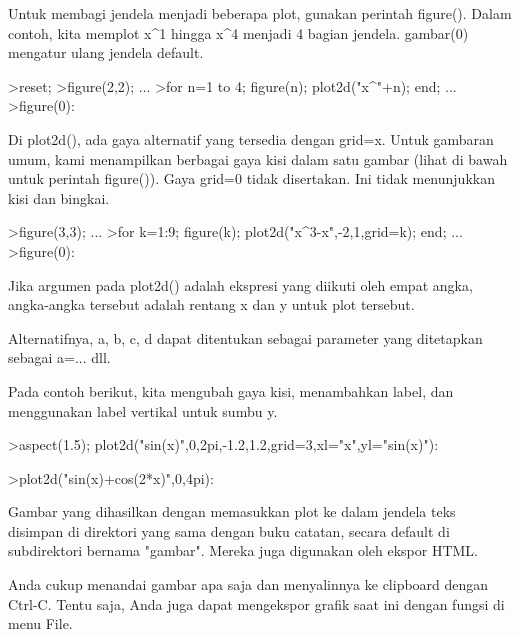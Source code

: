 \documentclass[a4paper,10pt]{article}
\begin{document}
\begin{eulernotebook}
\begin{eulercomment}
\begin{eulercomment}
\begin{eulercomment}
\begin{eulercomment}
\begin{eulercomment}
Untuk membagi jendela menjadi beberapa plot, gunakan perintah
figure(). Dalam contoh, kita memplot x\textasciicircum{}1 hingga x\textasciicircum{}4 menjadi 4 bagian
jendela. gambar(0) mengatur ulang jendela default.
\end{eulercomment}
\begin{eulerprompt}
>reset;
>figure(2,2); ...
>for n=1 to 4; figure(n); plot2d("x^"+n); end; ...
>figure(0):
\end{eulerprompt}
\begin{eulercomment}
Di plot2d(), ada gaya alternatif yang tersedia dengan grid=x. Untuk
gambaran umum, kami menampilkan berbagai gaya kisi dalam satu gambar
(lihat di bawah untuk perintah figure()). Gaya grid=0 tidak
disertakan. Ini tidak menunjukkan kisi dan bingkai.
\end{eulercomment}
\begin{eulerprompt}
>figure(3,3); ...
>for k=1:9; figure(k); plot2d("x^3-x",-2,1,grid=k); end; ...
>figure(0):
\end{eulerprompt}
\begin{eulercomment}
Jika argumen pada plot2d() adalah ekspresi yang diikuti oleh empat
angka, angka-angka tersebut adalah rentang x dan y untuk plot
tersebut.

Alternatifnya, a, b, c, d dapat ditentukan sebagai parameter yang
ditetapkan sebagai a=... dll.

Pada contoh berikut, kita mengubah gaya kisi, menambahkan label, dan
menggunakan label vertikal untuk sumbu y.
\end{eulercomment}
\begin{eulerprompt}
>aspect(1.5); plot2d("sin(x)",0,2pi,-1.2,1.2,grid=3,xl="x",yl="sin(x)"):
\end{eulerprompt}
\begin{eulerprompt}
>plot2d("sin(x)+cos(2*x)",0,4pi):
\end{eulerprompt}
\begin{eulercomment}
Gambar yang dihasilkan dengan memasukkan plot ke dalam jendela teks
disimpan di direktori yang sama dengan buku catatan, secara default di
subdirektori bernama "gambar". Mereka juga digunakan oleh ekspor HTML.

Anda cukup menandai gambar apa saja dan menyalinnya ke clipboard
dengan Ctrl-C. Tentu saja, Anda juga dapat mengekspor grafik saat ini
dengan fungsi di menu File.


\end{eulercomment}
\end{eulercomment}
\end{eulercomment}
\end{eulercomment}
\end{eulercomment}
\end{eulernotebook}
\end{document}
